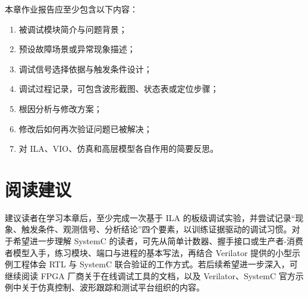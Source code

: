本章作业报告应至少包含以下内容：

\begin{enumerate}
\def\labelenumi{\arabic{enumi}.}
\tightlist
\item
  被调试模块简介与问题背景；
\item
  预设故障场景或异常现象描述；
\item
  调试信号选择依据与触发条件设计；
\item
  调试过程记录，可包含波形截图、状态表或定位步骤；
\item
  根因分析与修改方案；
\item
  修改后如何再次验证问题已被解决；
\item
  对 ILA、VIO、仿真和高层模型各自作用的简要反思。
\end{enumerate}

\section{阅读建议}\label{ux9605ux8bfbux5efaux8bae}

建议读者在学习本章后，至少完成一次基于 ILA
的板级调试实验，并尝试记录``现象、触发条件、观测信号、分析结论''四个要素，以训练证据驱动的调试习惯。对于希望进一步理解
SystemC
的读者，可先从简单计数器、握手接口或生产者-消费者模型入手，练习模块、端口与进程的基本写法，再结合
Verilator 提供的小型示例工程体会 RTL 与 SystemC
联合验证的工作方式。若后续希望进一步深入，可继续阅读 FPGA
厂商关于在线调试工具的文档，以及 Verilator、SystemC
官方示例中关于仿真控制、波形跟踪和测试平台组织的内容。

